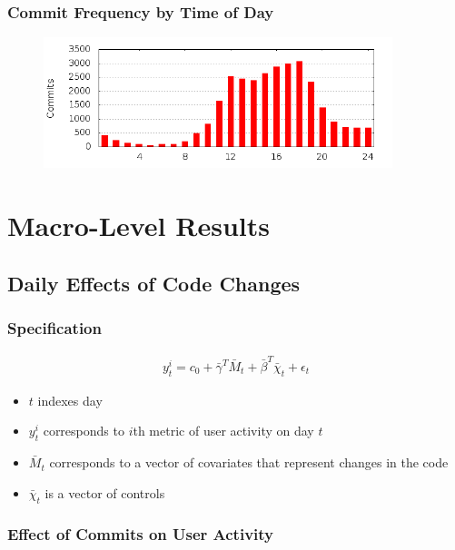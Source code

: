 \documentclass[xcolor=pdftex,dvipsnames,table]{beamer}
\begin{document}
\frame
{
    \frametitle{Commit Frequency by Time of Day}
    \begin{figure}[h!]
    \centering
    \includegraphics[width=4in]{pictures/commit-hours.png}
    \label{fig:commit-hours}
    \end{figure}

}

\section{Macro-Level Results}

\subsection{Daily Effects of Code Changes}

\frame
{
    \frametitle{Specification}
    \begin{eqnarray}
    y^i_{t} = c_0 + \bar{\gamma}^T \bar{M}_t + \bar{\beta}^T \bar{\chi}_t + \epsilon_t
    \end{eqnarray}

    \begin{itemize}
        \item $t$ indexes day
        \item $y^i_t$ corresponds to $i$th metric of user activity on day $t$
        \item $\bar{M}_t$ corresponds to a vector of covariates that represent changes in the code
        \item $\bar{\chi}_t$ is a vector of controls
    \end{itemize}
}   

\frame
{
    \frametitle{Effect of Commits on User Activity}
}
\end{document}
